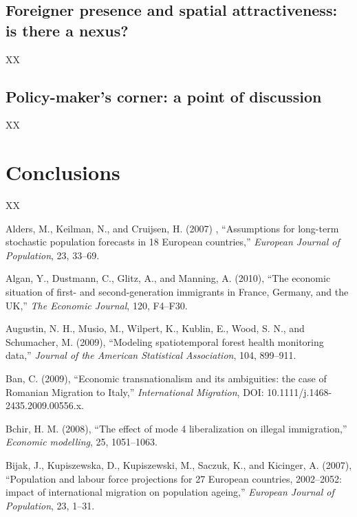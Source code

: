 \documentclass[10pt] {article}
\theoremstyle{definition}
\theoremstyle{plain}
\begin{document}
\subsection{Foreigner presence and spatial attractiveness: is there a nexus? \label{NEX}}
XX

\subsection{Policy-maker's corner: a point of discussion \label{PM}}
XX

\section{Conclusions \label{CONC}}
XX




\begin{thebibliography}{99}

\bibitem{} Alders, M., Keilman, N., and Cruijsen, H. (2007) , ``Assumptions for long-term stochastic population forecasts in 18 European countries,'' \textit{European Journal of Population}, 23, 33--69.

\bibitem{} Algan, Y., Dustmann, C., Glitz, A., and Manning, A. (2010), ``The economic situation of first- and second-generation immigrants in France, Germany, and the UK,'' \textit{The Economic Journal}, 120, F4--F30.

\bibitem{} Augustin, N. H., Musio, M., Wilpert, K., Kublin, E., Wood, S. N., and Schumacher, M. (2009), ``Modeling spatiotemporal forest health monitoring data,'' \textit{Journal of the American Statistical Association}, 104, 899--911.

\bibitem{} Ban, C. (2009), ``Economic transnationalism and its ambiguities: the case of Romanian Migration to Italy,'' \textit{International Migration}, DOI: 10.1111/j.1468-2435.2009.00556.x.


\bibitem{} Bchir, H. M. (2008), ``The effect of mode 4 liberalization on illegal immigration,'' \textit{Economic modelling}, 25, 1051--1063.

\bibitem{} Bijak, J., Kupiszewska, D., Kupiszewski, M., Saczuk, K., and Kicinger, A. (2007), ``Population and labour force projections for 27 European countries, 2002--2052: impact of international migration on population ageing,'' \textit{European Journal of Population}, 23, 1--31.


\end{thebibliography}
\end{document}

